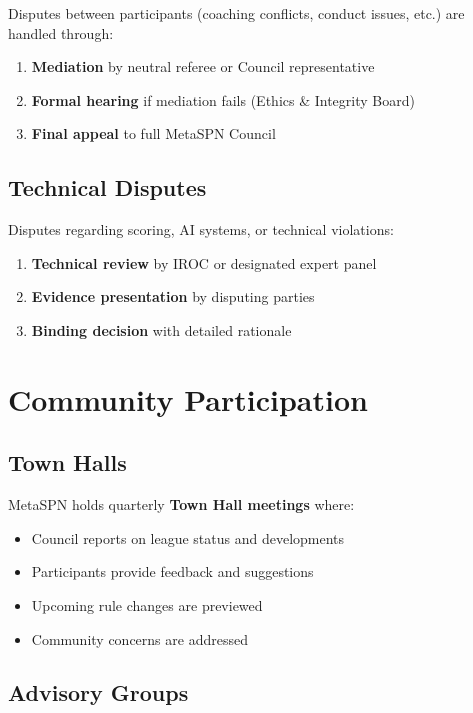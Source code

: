 Disputes between participants (coaching conflicts, conduct issues, etc.) are handled through:
\begin{enumerate}
  \item \textbf{Mediation} by neutral referee or Council representative
  \item \textbf{Formal hearing} if mediation fails (Ethics \& Integrity Board)
  \item \textbf{Final appeal} to full MetaSPN Council
\end{enumerate}

\subsection{Technical Disputes}

Disputes regarding scoring, AI systems, or technical violations:
\begin{enumerate}
  \item \textbf{Technical review} by IROC or designated expert panel
  \item \textbf{Evidence presentation} by disputing parties
  \item \textbf{Binding decision} with detailed rationale
\end{enumerate}

\section{Community Participation}

\subsection{Town Halls}

MetaSPN holds quarterly \textbf{Town Hall meetings} where:
\begin{itemize}[leftmargin=*]
  \item Council reports on league status and developments
  \item Participants provide feedback and suggestions
  \item Upcoming rule changes are previewed
  \item Community concerns are addressed
\end{itemize}

\subsection{Advisory Groups}


